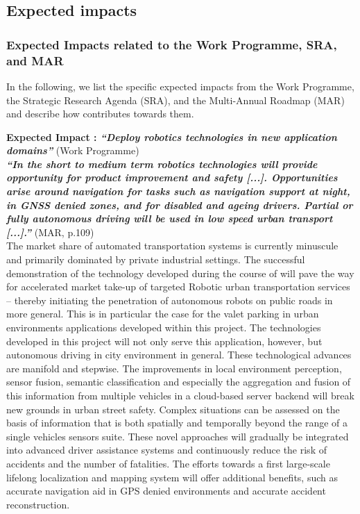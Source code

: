 
\subsection{Expected impacts}
\label{sec:impact_expected}
\subsubsection{Expected Impacts related to the Work Programme, SRA, and MAR} 
In the following, we list the specific expected impacts from the Work Programme, the Strategic Research Agenda (SRA), and the Multi-Annual Roadmap (MAR) and describe how \Project{} contributes towards them.

\textbf{Expected Impact  : \textit{``Deploy robotics technologies in new application domains''}} (Work Programme) \\
\textbf{\textit{``In the short to medium term robotics technologies will provide opportunity for product improvement and safety [...]. Opportunities arise around navigation for tasks such as navigation support at night, in GNSS denied zones, and for disabled and ageing drivers. Partial or fully autonomous driving will be used in low speed urban transport [...].''}} (MAR, p.109) \\
The market share of automated transportation systems is currently minuscule and primarily dominated by private industrial settings. The successful demonstration of the technology developed during the course of \Project{} will pave the way for accelerated market take-up of targeted Robotic urban transportation services -- thereby initiating the penetration of autonomous robots on public roads in more general. This is in particular the case for the valet parking in urban environments applications developed within this project. The technologies developed in this project will not only serve this application, however, but autonomous driving in city environment in general. These technological advances are manifold and stepwise. The improvements in local environment perception, sensor fusion, semantic classification and especially the aggregation and fusion of this information from multiple vehicles in a cloud-based server backend will break new grounds in urban street safety. Complex situations can be assessed on the basis of information that is both spatially and temporally beyond the range of a single vehicles sensors suite. These novel approaches will gradually be integrated into advanced driver assistance systems and continuously reduce the risk of accidents and the number of fatalities. The efforts towards a first large-scale lifelong localization and mapping system will offer additional benefits, such as accurate navigation aid in GPS denied environments and accurate accident reconstruction.


